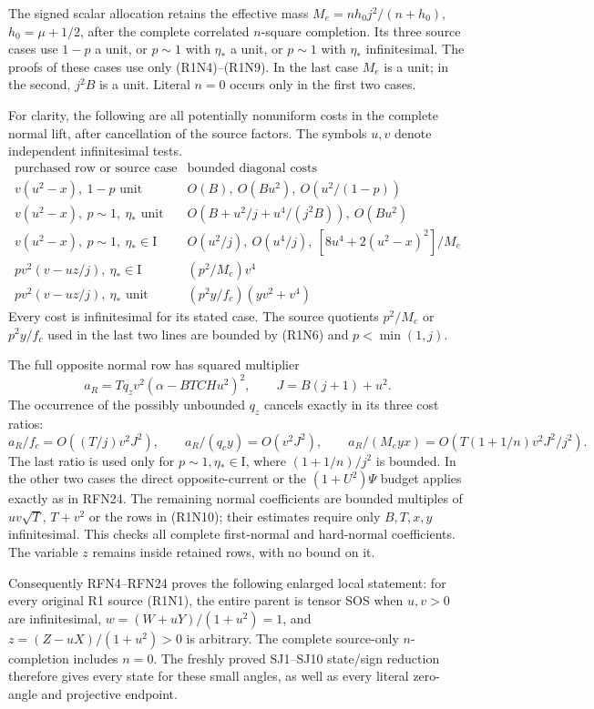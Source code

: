 The signed scalar allocation retains the effective mass
$M_e=nh_0j^2/(n+h_0)$, $h_0=\mu+1/2$, after the complete
correlated $n$-square completion.  Its three source cases use
$1-p$ a unit, or $p\sim1$ with $\eta_*$ a unit, or
$p\sim1$ with $\eta_*$ infinitesimal.  The proofs of these cases use
only (R1N4)--(R1N9).  In the last case $M_e$ is a unit; in the second,
$j^2B$ is a unit.  Literal $n=0$ occurs only in the first two cases.

For clarity, the following are all potentially nonuniform costs in
the complete normal lift, after cancellation of the source factors.
The symbols $u,v$ denote independent infinitesimal tests.
\[
\begin{array}{c|c}
 \text{purchased row or source case}&\text{bounded diagonal costs}\\ \hline
 v(u^2-x),\ 1-p\text{ unit}
       &O(B),\ O(Bu^2),\ O(u^2/(1-p))\\
 v(u^2-x),\ p\sim1,\ \eta_*\text{ unit}
       &O(B+u^2/j+u^4/(j^2B)),\ O(Bu^2)\\
 v(u^2-x),\ p\sim1,\ \eta_*\in\mathrm I
       &O(u^2/j),\ O(u^4/j),\
            [8u^4+2(u^2-x)^2]/M_e\\
 pv^2(v-uz/j),\ \eta_*\in\mathrm I
       &(p^2/M_e)v^4\\
 pv^2(v-uz/j),\ \eta_*\text{ unit}
       &(p^2y/f_c)(yv^2+v^4)
\end{array}                                                   \tag{R1N10}
\]
Every cost is infinitesimal for its stated case.  The source quotients
$p^2/M_e$ or $p^2y/f_c$ used in the last two lines are bounded by
(R1N6) and $p<\min(1,j)$.

The full opposite normal row has squared multiplier
\[
 a_R=Tq_zv^2(\alpha-BTCHu^2)^2,\qquad
 J=B(j+1)+u^2 .
\]
The occurrence of the possibly unbounded $q_z$ cancels exactly in
its three cost ratios:
\[
 a_R/f_c=O((T/j)v^2J^2),\qquad
 a_R/(q_cy)=O(v^2J^2),\qquad
 a_R/(M_eyx)=O\!\left(T(1+1/n)v^2J^2/j^2\right).        \tag{R1N11}
\]
The last ratio is used only for $p\sim1,\eta_*\in\mathrm I$,
where $(1+1/n)/j^2$ is bounded.  In the other two cases the
direct opposite-current or the $(1+U^2)\Psi$ budget applies exactly
as in RFN24.  The remaining normal coefficients are bounded
multiples of $uv\sqrt T$, $T+v^2$ or the rows in (R1N10);
their estimates require only $B,T,x,y$ infinitesimal.
This checks all complete first-normal and hard-normal coefficients.
The variable $z$ remains inside retained rows, with no bound on it.

Consequently RFN4--RFN24 proves the following enlarged local statement:
for every original R1 source (R1N1), the entire parent is tensor SOS
when $u,v>0$ are infinitesimal, $w=(W+uY)/(1+u^2)=1$, and
$z=(Z-uX)/(1+u^2)>0$ is arbitrary.  The complete source-only
$n$-completion includes $n=0$.  The freshly proved SJ1--SJ10
state/sign reduction therefore gives every state for these small
angles, as well as every literal zero-angle and projective endpoint.

